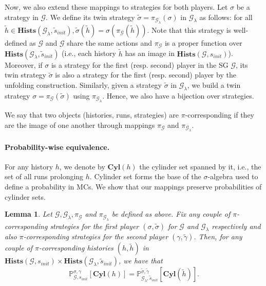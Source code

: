 \documentclass{article}
\newcommand{\IP}{\mathbb{P}}
\newcommand{\CG}{\mathcal{G}}
\newcommand{\Hists}{\textbf{Hists}}
\newcommand{\Cyl}{\textbf{Cyl}}
\theoremstyle{plain}
\newtheorem{lem}[thm]{Lemma}
\begin{document}
Now, we also extend these mappings to strategies for both players. Let $\sigma$ be a strategy in $\CG$. We define its twin strategy $\tilde{\sigma} = \pi_{\CG_{\lambda}}(\sigma)$ in $\CG_{\lambda}$ as follows: for all $\tilde{h} \in \Hists(\CG_{\lambda}, \tilde{s}_{init}), \tilde{\sigma}(\tilde{h}) = \sigma(\pi_{\CG}(\tilde{h}))$. Note that this strategy is well-defined as $\CG$ and $\CG$ share the same actions and $\pi_{\CG}$ is a proper function over $\Hists(\CG_{\lambda}, \tilde{s}_{init})$ (i.e., each history $\tilde{h}$ has an image in $\Hists(\CG, s_{init})$). Moreover, if $\sigma$ is a strategy for the first (resp. second) player in the SG $\CG$, its twin strategy $\tilde{\sigma}$ is also a strategy for the first (resp. second) player by the unfolding construction.
Similarly, given a strategy $\tilde{\sigma}$ in $\CG_{\lambda}$, we build a twin strategy $\sigma = \pi_{\CG}(\tilde{\sigma})$ using $\pi_{\CG_{\lambda}}$. Hence, we also have a bijection over strategies.

We say that two objects (histories, runs, strategies) are $\pi$-corresponding if they are the image of one another through mappings $\pi_{\CG}$ and $\pi_{\CG_{\lambda}}$.

\paragraph{Probability-wise equivalence.}
For any history $h$, we denote by $\Cyl(h)$ the cylinder set spanned by it, i.e., the set of all runs prolonging $h$. Cylinder set forms the base of the $\sigma$-algebra used to define a probability in MCs. We show that our mappings preserve probabilities of cylinder sets.

\begin{lem}
Let $\CG, \CG_{\lambda}, \pi_{\CG}$ and $\pi_{\CG_{\lambda}}$ be defined as above. Fix any couple of $\pi$-corresponding strategies for the first player $(\sigma, \tilde{\sigma})$ for $\CG$ and $\CG_{\lambda}$ respectively and also $\pi$-corresponding strategies for the second player $(\gamma, \tilde{\gamma})$.  Then, for any couple of $\pi$-corresponding histories $(h, \tilde{h})$ in $\Hists(\CG, s_{init}) \times \Hists(\CG_{\lambda}, \tilde{s}_{init})$, we have that
\begin{equation}
\IP_{\CG, s_{init}}^{\sigma, \gamma} [\Cyl(h)] = \IP_{\CG_{\lambda}, \tilde{s}_{init}}^{\tilde{\sigma}, \tilde{\gamma}} [\Cyl(\tilde{h})].
\end{equation}
\end{lem}
\end{document}
